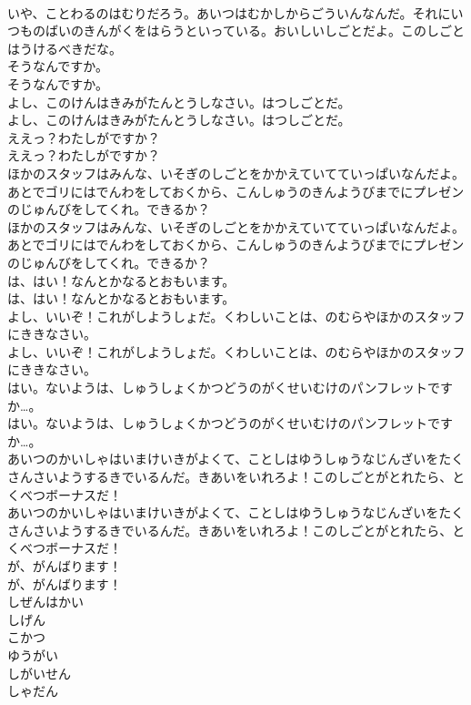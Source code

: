 \documentclass[8pt]{extreport}
\begin{document}
\begin{CJK}{UTF8}{min}
\\	いや、ことわるのはむりだろう。あいつはむかしからごういんなんだ。それにいつものばいのきんがくをはらうといっている。おいしいしごとだよ。このしごとはうけるべきだな。
\\	そうなんですか。
\\	そうなんですか。
\\	よし、このけんはきみがたんとうしなさい。はつしごとだ。
\\	よし、このけんはきみがたんとうしなさい。はつしごとだ。
\\	ええっ？わたしがですか？
\\	ええっ？わたしがですか？
\\	ほかのスタッフはみんな、いそぎのしごとをかかえていてていっぱいなんだよ。あとでゴリにはでんわをしておくから、こんしゅうのきんようびまでにプレゼンのじゅんびをしてくれ。できるか？
\\	ほかのスタッフはみんな、いそぎのしごとをかかえていてていっぱいなんだよ。あとでゴリにはでんわをしておくから、こんしゅうのきんようびまでにプレゼンのじゅんびをしてくれ。できるか？
\\	は、はい！なんとかなるとおもいます。
\\	は、はい！なんとかなるとおもいます。
\\	よし、いいぞ！これがしようしょだ。くわしいことは、のむらやほかのスタッフにききなさい。
\\	よし、いいぞ！これがしようしょだ。くわしいことは、のむらやほかのスタッフにききなさい。
\\	はい。ないようは、しゅうしょくかつどうのがくせいむけのパンフレットですか…。
\\	はい。ないようは、しゅうしょくかつどうのがくせいむけのパンフレットですか…。
\\	あいつのかいしゃはいまけいきがよくて、ことしはゆうしゅうなじんざいをたくさんさいようするきでいるんだ。きあいをいれろよ！このしごとがとれたら、とくべつボーナスだ！
\\	あいつのかいしゃはいまけいきがよくて、ことしはゆうしゅうなじんざいをたくさんさいようするきでいるんだ。きあいをいれろよ！このしごとがとれたら、とくべつボーナスだ！
\\	が、がんばります！
\\	が、がんばります！
\\	しぜんはかい
\\	しげん
\\	こかつ
\\	ゆうがい
\\	しがいせん
\\	しゃだん

\end{CJK}
\end{document}
